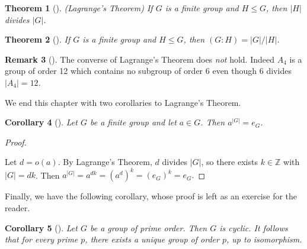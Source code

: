 \documentclass[10pt,]{book}
\theoremstyle{plain}
\newtheorem{theorem}{Theorem}[section]
\newtheorem{corollary}[theorem]{Corollary}
\theoremstyle{definition}
\theoremstyle{definition}
\newtheorem{remark}[theorem]{Remark}
\theoremstyle{definition}
\theoremstyle{definition}
\numberwithin{equation}{section}
\def\Z{\mathbb{Z}}
\begin{document}
\begin{theorem}[{}]\label{theorem-47}
\emph{(Lagrange's Theorem)} If \(G\) is a finite group and \(H\leq G\), then \(|H|\) divides \(|G|\).%
\end{theorem}
\begin{theorem}[{}]\label{indexfin}
If \(G\) is a finite group and \(H\leq G\), then \((G:H)=|G|/|H|\).%
\end{theorem}
\begin{remark}[]\label{remark-38}
The converse of Lagrange's Theorem does \emph{not} hold. Indeed \(A_4\) is a group of order 12 which contains no subgroup of order \(6\) even though \(6\) divides \(|A_4|=12\).%
\end{remark}
We end this chapter with two corollaries to Lagrange's Theorem.%
\begin{corollary}[{}]\label{corollary-6}
Let \(G\) be a finite group and let \(a\in G\). Then \(a^{|G|}=e_G\).%
\end{corollary}
\begin{proof}\hypertarget{proof-40}{}
Let \(d=o(a)\). By Lagrange's Theorem, \(d\) divides \(|G|\), so there exists \(k\in \Z\) with \(|G|=dk\). Then \(a^{|G|}=a^{dk}=(a^d)^k=(e_G)^k=e_G.\)%
\end{proof}
Finally, we have the following corollary, whose proof is left as an exercise for the reader.%
\begin{corollary}[{}]\label{pcyc}
Let \(G\) be a group of prime order. Then \(G\) is cyclic. It follows that for every prime \(p\), there exists a unique group of order \(p\), up to isomorphism.%
\end{corollary}
\typeout{************************************************}
\typeout{************************************************}
\end{document}
